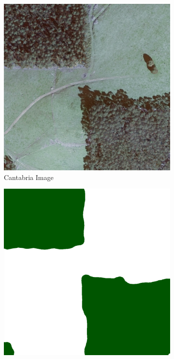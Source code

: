 \begin{figure}[H]
\centering
\begin{subfigure}{0.32\textwidth}
    \centering
    \includegraphics[width=\textwidth]{IMAGENES/Result_Img1.png}
    \caption{Cantabria Image}
    \label{fig:img1}
\end{subfigure}
\hfill
\begin{subfigure}{0.32\textwidth}
    \centering
    \includegraphics[width=\textwidth]{IMAGENES/Result_Mask1_J.png}

\end{subfigure}
\end{figure}
